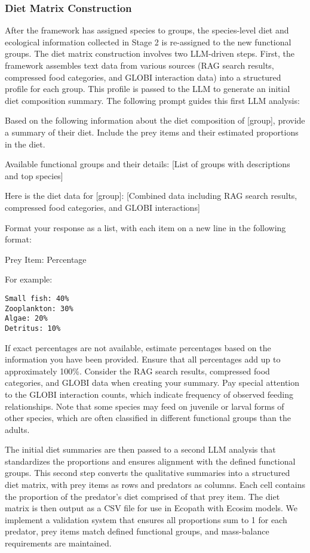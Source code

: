 \subsubsection{Diet Matrix Construction}

After the framework has assigned species to groups, the species-level diet and ecological information collected in Stage 2 is re-assigned to the new functional groups. The diet matrix construction involves two LLM-driven steps. First, the framework assembles text data from various sources (RAG search results, compressed food categories, and GLOBI interaction data) into a structured profile for each group. This profile is passed to the LLM to generate an initial diet composition summary. The following prompt guides this first LLM analysis:

\begin{prompt}
Based on the following information about the diet composition of [group], provide a summary of their diet. Include the prey items and their estimated proportions in the diet.

Available functional groups and their details:
[List of groups with descriptions and top species]

Here is the diet data for [group]:
[Combined data including RAG search results, compressed food categories, and GLOBI interactions]

Format your response as a list, with each item on a new line in the following format:

Prey Item: Percentage

For example:
\begin{verbatim}
Small fish: 40%
Zooplankton: 30%
Algae: 20%
Detritus: 10%
\end{verbatim}

If exact percentages are not available, estimate percentages based on the information you have been provided.
Ensure that all percentages add up to approximately 100\%.
Consider the RAG search results, compressed food categories, and GLOBI data when creating your summary.
Pay special attention to the GLOBI interaction counts, which indicate frequency of observed feeding relationships.
Note that some species may feed on juvenile or larval forms of other species, which are often classified in different functional groups than the adults.
\end{prompt}

The initial diet summaries are then passed to a second LLM analysis that standardizes the proportions and ensures alignment with the defined functional groups. This second step converts the qualitative summaries into a structured diet matrix, with prey items as rows and predators as columns. Each cell contains the proportion of the predator's diet comprised of that prey item. The diet matrix is then output as a CSV file for use in Ecopath with Ecosim models. We implement a validation system that ensures all proportions sum to 1 for each predator, prey items match defined functional groups, and mass-balance requirements are maintained.

